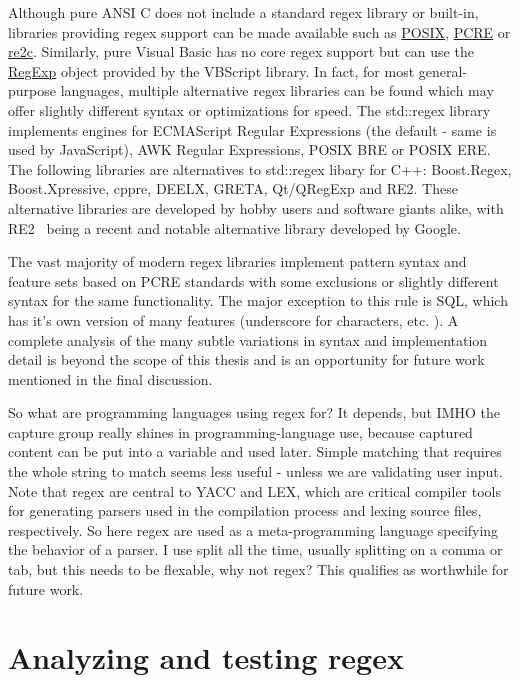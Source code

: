 Although pure ANSI C does not include a standard regex library or built-in, libraries providing regex support can be made available such as \underline{POSIX}, \underline{PCRE} or \underline{re2c}.  Similarly, pure Visual Basic has no core regex support but can use the \underline{RegExp} object provided by the VBScript library.  In fact, for most general-purpose languages, multiple alternative regex libraries can be found which may offer slightly different syntax or optimizations for speed.  The std::regex library implements engines for ECMAScript Regular Expressions (the default - same is used by JavaScript), AWK Regular Expressions,  POSIX BRE or POSIX ERE.  The following libraries are alternatives to std::regex libary for C++: Boost.Regex, Boost.Xpressive, cppre, DEELX, GRETA, Qt/QRegExp and RE2.  These alternative libraries are developed by hobby users and software giants alike, with RE2~\cite{re2} being a recent and notable alternative library developed by Google.

The vast majority of modern regex libraries implement pattern syntax and feature sets based on PCRE standards with some exclusions or slightly different syntax for the same functionality. The major exception to this rule is SQL, which has it's own version of many features (underscore for characters, etc. ). A complete analysis of the many subtle variations in syntax and implementation detail is beyond the scope of this thesis and is an opportunity for future work mentioned in the final discussion.

 So what are programming languages using regex for?  It depends, but IMHO the capture group really shines in programming-language use, because captured content can be put into a variable and used later.  Simple matching that requires the whole string to match seems less useful - unless we are validating user input.  Note that regex are central to YACC and LEX, which are critical compiler tools for generating parsers used in the compilation process and lexing source files, respectively.  So here regex are used as a meta-programming language specifying the behavior of a parser.  I use split all the time, usually splitting on a comma or tab, but this needs to be flexable, why not regex?  This qualifies as worthwhile for future work.

\section{Analyzing and testing regex}

